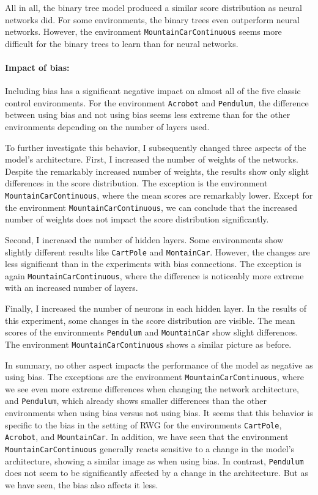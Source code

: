 All in all, the binary tree model produced a similar score distribution as neural networks did. For some environments, the binary trees even outperform neural networks. However, the environment \verb|MountainCarContinuous| seems more difficult for the binary trees to learn than for neural networks.

\paragraph*{Impact of bias:} Including bias has a significant negative impact on almost all of the five classic control environments. For the environment \verb|Acrobot| and \verb|Pendulum|, the difference between using bias and not using bias seems less extreme than for the other environments depending on the number of layers used.

To further investigate this behavior, I subsequently changed three aspects of the model's architecture. First, I increased the number of weights of the networks. Despite the remarkably increased number of weights, the results show only slight differences in the score distribution. The exception is the environment \verb|MountainCarContinuous|, where the mean scores are remarkably lower. Except for the environment \verb|MountainCarContinuous|, we can conclude that the increased number of weights does not impact the score distribution significantly.

Second, I increased the number of hidden layers. Some environments show slightly different results like \verb|CartPole| and \verb|MontainCar|. However, the changes are less significant than in the experiments with bias connections. The exception is again \verb|MountainCarContinuous|, where the difference is noticeably more extreme with an increased number of layers.

Finally, I increased the number of neurons in each hidden layer. In the results of this experiment, some changes in the score distribution are visible. The mean scores of the environments \verb|Pendulum| and \verb|MountainCar| show slight differences. The environment \verb|MountainCarContinuous| shows a similar picture as before.

In summary, no other aspect impacts the performance of the model as negative as using bias. The exceptions are the environment \verb|MountainCarContinuous|, where we see even more extreme differences when changing the network architecture, and \verb|Pendulum|, which already shows smaller differences than the other environments when using bias versus not using bias. It seems that this behavior is specific to the bias in the setting of RWG for the environments \verb|CartPole|, \verb|Acrobot|, and \verb|MountainCar|. In addition, we have seen that the environment \verb|MountainCarContinuous| generally reacts sensitive to a change in the model's architecture, showing a similar image as when using bias. In contrast, \verb|Pendulum| does not seem to be significantly affected by a change in the architecture. But as we have seen, the bias also affects it less.
